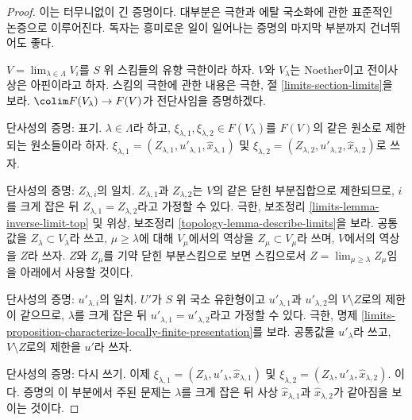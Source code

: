\begin{proof}
이는 터무니없이 긴 증명이다. 대부분은 극한과 에탈 국소화에 관한
표준적인 논증으로 이루어진다. 독자는 흥미로운 일이 일어나는 증명의
마지막 부분까지 건너뛰어도 좋다.

\medskip\noindent
$V = \lim_{\lambda \in \Lambda} V_i$를 $S$ 위 스킴들의 유향 극한이라 하자.
$V$와 $V_\lambda$는 Noether이고 전이사상은 아핀이라고 하자.
스킴의 극한에 관한 내용은 극한, 절 \ref{limits-section-limits}을 보라.
$\colim F(V_\lambda) \to F(V)$가 전단사임을 증명하겠다.

\medskip\noindent
단사성의 증명: 표기.
$\lambda \in \Lambda$라 하고,
$\xi_{\lambda, 1}, \xi_{\lambda, 2} \in F(V_\lambda)$를
$F(V)$의 같은 원소로 제한되는 원소들이라 하자.
$\xi_{\lambda, 1} = (Z_{\lambda, 1}, u'_{\lambda, 1},
\hat x_{\lambda, 1})$ 및
$\xi_{\lambda, 2} = (Z_{\lambda, 2}, u'_{\lambda, 2}, \hat x_{\lambda, 2})$로 쓰자.

\medskip\noindent
단사성의 증명: $Z_{\lambda, i}$의 일치.
$Z_{\lambda, 1}$과 $Z_{\lambda, 2}$는 $V$의 같은 닫힌 부분집합으로
제한되므로, $i$를 크게 잡은 뒤
$Z_{\lambda, 1} = Z_{\lambda, 2}$라고 가정할 수 있다.
극한, 보조정리 \ref{limits-lemma-inverse-limit-top} 및
위상, 보조정리 \ref{topology-lemma-describe-limits}을 보라.
공통값을 $Z_\lambda \subset V_\lambda$라 쓰고, $\mu \geq \lambda$에 대해
$V_\mu$에서의 역상을 $Z_\mu \subset V_\mu$라 쓰며,
$V$에서의 역상을 $Z$라 쓰자. $Z$와 $Z_\mu$를 기약 닫힌 부분스킴으로
보면 스킴으로서
$Z = \lim_{\mu \geq \lambda} Z_\mu$임을 아래에서 사용할 것이다.

\medskip\noindent
단사성의 증명: $u'_{\lambda, i}$의 일치.
$U'$가 $S$ 위 국소 유한형이고 $u'_{\lambda, 1}$과
$u'_{\lambda, 2}$의 $V \setminus Z$로의 제한이 같으므로,
$\lambda$를 크게 잡은 뒤
$u'_{\lambda, 1} = u'_{\lambda, 2}$라고 가정할 수 있다.
극한, 명제 \ref{limits-proposition-characterize-locally-finite-presentation}를 보라.
공통값을 $u'_\lambda$라 쓰고, $V \setminus Z$로의 제한을 $u'$라 쓰자.

\medskip\noindent
단사성의 증명: 다시 쓰기.
이제
$\xi_{\lambda, 1} = (Z_\lambda, u'_\lambda, \hat x_{\lambda, 1})$ 및
$\xi_{\lambda, 2} = (Z_\lambda, u'_\lambda, \hat x_{\lambda, 2})$.
이다. 증명의 이 부분에서 주된 문제는 $\lambda$를 크게 잡은 뒤
사상 $\hat x_{\lambda, 1}$과 $\hat x_{\lambda, 2}$가 같아짐을 보이는 것이다.


\end{proof}
